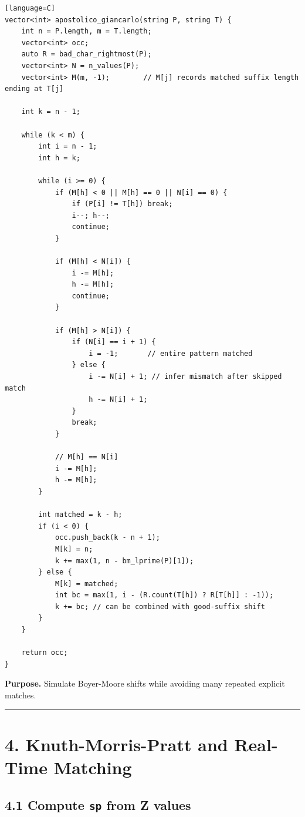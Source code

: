 \documentclass[11pt]{article}
\begin{document}
\begin{verbatim}[language=C]
vector<int> apostolico_giancarlo(string P, string T) {
    int n = P.length, m = T.length;
    vector<int> occ;
    auto R = bad_char_rightmost(P);
    vector<int> N = n_values(P);
    vector<int> M(m, -1);        // M[j] records matched suffix length ending at T[j]

    int k = n - 1;

    while (k < m) {
        int i = n - 1;
        int h = k;

        while (i >= 0) {
            if (M[h] < 0 || M[h] == 0 || N[i] == 0) {
                if (P[i] != T[h]) break;
                i--; h--;
                continue;
            }

            if (M[h] < N[i]) {
                i -= M[h];
                h -= M[h];
                continue;
            }

            if (M[h] > N[i]) {
                if (N[i] == i + 1) {
                    i = -1;       // entire pattern matched
                } else {
                    i -= N[i] + 1; // infer mismatch after skipped match
                    h -= N[i] + 1;
                }
                break;
            }

            // M[h] == N[i]
            i -= M[h];
            h -= M[h];
        }

        int matched = k - h;
        if (i < 0) {
            occ.push_back(k - n + 1);
            M[k] = n;
            k += max(1, n - bm_lprime(P)[1]);
        } else {
            M[k] = matched;
            int bc = max(1, i - (R.count(T[h]) ? R[T[h]] : -1));
            k += bc; // can be combined with good-suffix shift
        }
    }

    return occ;
}
\end{verbatim}

\textbf{Purpose.} Simulate Boyer-Moore shifts while avoiding many repeated explicit matches.

\begin{center}\rule{0.5\linewidth}{0.5pt}\end{center}

\section{4. Knuth-Morris-Pratt and Real-Time Matching}\label{knuth-morris-pratt-and-real-time-matching}

\subsection{\texorpdfstring{4.1 Compute \texttt{sp} from Z values}{4.1 Compute sp from Z values}}\label{compute-sp-from-z-values}
\end{document}
